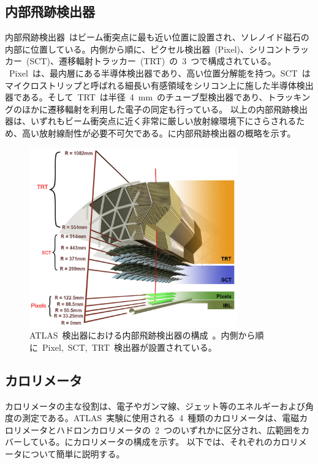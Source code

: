 \subsection{内部飛跡検出器}
内部飛跡検出器~\cite{URL:19}はビーム衝突点に最も近い位置に設置され、ソレノイド磁石の内部に位置している。内側から順に、ピクセル検出器~(Pixel)、シリコントラッカー~(SCT)、遷移輻射トラッカー~(TRT)~の~3~つで構成されている。
~Pixel~は、最内層にある半導体検出器であり、高い位置分解能を持つ。SCT~はマイクロストリップと呼ばれる細長い有感領域をシリコン上に施した半導体検出器である。そして~TRT~は半径~4~mm~のチューブ型検出器であり、トラッキングのほかに遷移輻射を利用した電子の同定も行っている。
以上の内部飛跡検出器は、いずれもビーム衝突点に近く非常に厳しい放射線環境下にさらされるため、高い放射線耐性が必要不可欠である。に内部飛跡検出器の概略を示す。

\begin{figure}[tbp]
    \centering   
    \includegraphics[width=0.8\textwidth,page=1]{img/jpeg/id.pdf}
    \caption[ATLAS~検出器における内部飛跡検出器の構成]{ATLAS~検出器における内部飛跡検出器の構成~\cite{URL:19}。内側から順に~Pixel,~SCT,~TRT~検出器が設置されている。}\label{fig:innr}
\end{figure}

\subsection{カロリメータ}
カロリメータの主な役割は、電子やガンマ線、ジェット等のエネルギーおよび角度の測定である。ATLAS~実験に使用される~4~種類のカロリメータは、電磁カロリメータとハドロンカロリメータの~2~つのいずれかに区分され、広範囲をカバーしている。にカロリメータの構成を示す。
以下では、それぞれのカロリメータについて簡単に説明する。

